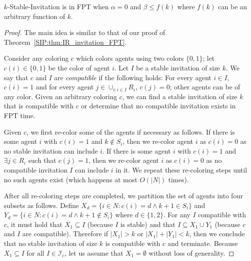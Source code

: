 \begin{theorem} \label{SIP:thm:stable_FPT}
	$k$-Stable-Invitation is in FPT when $\alpha = 0$ and $\beta \leq f(k)$ where $f(k)$ can be an arbitrary function of $k$.
\end{theorem}
\begin{proof}
	The main idea is similar to that of our proof of Theorem~\ref{SIP:thm:IR_invitation_FPT}. 

	Consider any coloring $c$ which colors agents using two colors $\{0, 1\}$; let $c(i)\in \{0,1\}$ be the color of agent $i$. Let $I$ be a stable invitation of size $k$. We say that $c$ and $I$ are {\em compatible} if the following holds: For every agent $i\in I$, $c(i) = 1$ and for every agent $j\in \cup_{i: i\in I} R_i$, $c(j) = 0$; other agents can be of any color. 
	Given an arbitrary coloring $c$, we can find a stable invitation of size $k$ that is compatible with $c$ or determine that no compatible invitation exists in FPT time. 

	Given $c$, we first re-color some of the agents if necessary as follows. If there is some agent $i$ with $c(i) = 1$ and $k\not\in S_i$, then we re-color agent $i$ as $c(i) = 0$ as no stable invitation can include $i$. If there is some agent $i$ with $c(i) = 1$ and $\exists j\in R_i$ such that $c(j) = 1$, then we re-color agent $i$ as $c(i) = 0$ as no compatible invitation $I$ can include $i$ in it. We repeat these re-coloring steps until no such agents exist (which happens at most $O(|N|)$ times). 
	
	After all re-coloring steps are completed, we partition the set of agents into four subsets as follows. Define $X_d = \{i\in N : c(i) = d \land k+1\in S_i\}$ and $Y_d = \{i\in N : c(i) = d \land k+1\not\in S_i\}$ where $d\in \{1, 2\}$.
	For any $I$ compatible with $c$, it must hold that $X_1 \subseteq I$ (because $I$ is stable) and that $I \subseteq X_1 \cup Y_1$ (because $c$ and $I$ are compatible). 
	Therefore if $|X_1| > k$ or $|X_1| + |Y_1| < k$, then we conclude that no stable invitation of size $k$ is compatible with $c$ and terminate. Because $X_1 \subseteq I$ for all $I\in \mathcal{I}_c$, let us assume that $X_1 = \emptyset$ without loss of generality.
	

\end{proof}
